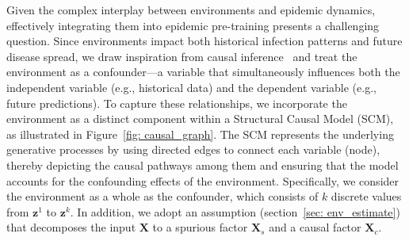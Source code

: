 Given the complex interplay between environments and epidemic dynamics, effectively integrating them into epidemic pre-training presents a challenging question. Since environments impact both historical infection patterns and future disease spread, we draw inspiration from causal inference~\cite{zhou2023causal, jiao2024causal} and treat the environment as a confounder—a variable that simultaneously influences both the independent variable (e.g., historical data) and the dependent variable (e.g., future predictions). To capture these relationships, we incorporate the environment as a distinct component within a Structural Causal Model (SCM), as illustrated in Figure~\ref{fig: causal_graph}. The SCM represents the underlying generative processes by using directed edges to connect each variable (node), thereby depicting the causal pathways among them and ensuring that the model accounts for the confounding effects of the environment. Specifically, we consider the environment as a whole as the confounder, which consists of $k$ discrete values from $\mathbf{z}^1$ to $\mathbf{z}^k$. In addition, we adopt an assumption (section~\ref{sec: env_estimate}) that decomposes the input $\mathbf{X}$ to a spurious factor $\mathbf{X}_s$ and a causal factor $\mathbf{X}_c$. 


